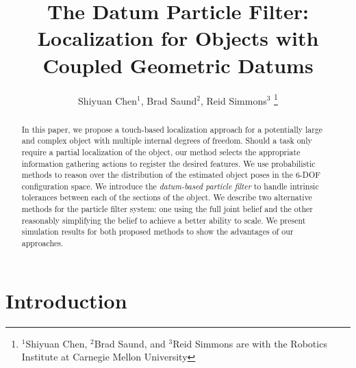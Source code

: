 \documentclass[letterpaper, 10 pt, conference]{ieeeconf}
\title{\LARGE \bf
The Datum Particle Filter: \\Localization for Objects with Coupled Geometric Datums
}
\author{Shiyuan Chen$^{1}$, Brad Saund$^{2}$, Reid Simmons$^{3}$%
\thanks{$^{1}$Shiyuan Chen, $^{2}$Brad Saund, and $^{3}$Reid Simmons are with the Robotics Institute at Carnegie Mellon University}%
}
\begin{document}
\maketitle
\thispagestyle{empty}
\pagestyle{empty}


\begin{abstract}


In this paper, we propose a touch-based localization approach for a potentially large and complex object with multiple internal degrees of freedom.
Should a task only require a partial localization of the object, our method selects the appropriate information gathering actions to register the desired features.
We use probabilistic methods to reason over the distribution of the estimated object poses in the 6-DOF configuration space.
We introduce the \textit{datum-based particle filter} to handle intrinsic tolerances between each of the sections of the object.
We describe two alternative methods for the particle filter system: one using the full joint belief and the other reasonably simplifying the belief to achieve a better ability to scale.
We present simulation results for both proposed methods to show the advantages of our approaches.

  
\end{abstract}


\section{Introduction}
\end{document}
